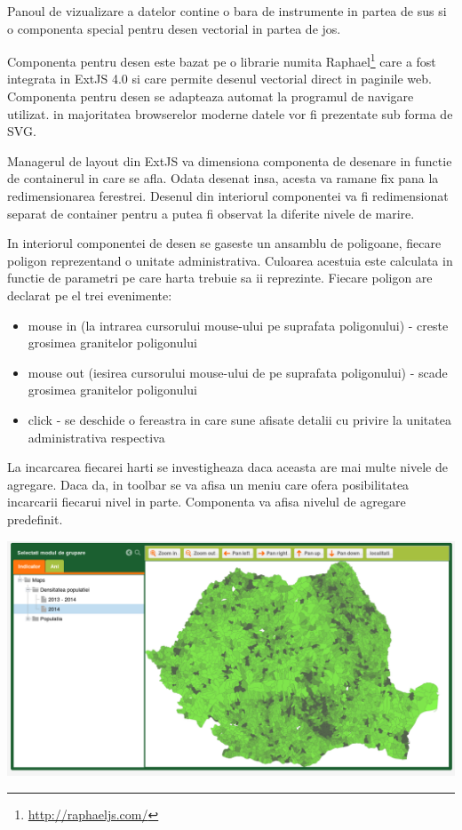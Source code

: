 \documentclass[a4paper, 10pt]{article}
\begin{document}
{Panoul de vizualizare a datelor contine o bara de instrumente in partea de sus si o componenta special pentru desen vectorial in partea de jos. 

Componenta pentru desen este bazat pe o librarie numita Raphael\footnote{\url{http://raphaeljs.com/}} care a fost integrata in ExtJS 4.0 si care permite desenul vectorial direct in paginile web. 
Componenta pentru desen se adapteaza automat la programul de navigare utilizat. in majoritatea browserelor moderne datele vor fi prezentate sub forma de SVG. 

Managerul de layout din ExtJS va dimensiona componenta de desenare in functie de containerul in care se afla. 
Odata desenat insa, acesta va ramane fix pana la redimensionarea ferestrei. 
Desenul din interiorul componentei va fi redimensionat separat de container pentru a putea fi observat la diferite nivele de marire. 

In interiorul componentei de desen se gaseste un ansamblu de poligoane, fiecare poligon reprezentand o unitate administrativa. 
Culoarea acestuia este calculata in functie de parametri pe care harta trebuie sa ii reprezinte. 
Fiecare poligon are declarat pe el trei evenimente:

\begin{itemize}
\item
mouse in (la intrarea cursorului mouse-ului pe suprafata poligonului) - creste grosimea granitelor poligonului
\item
mouse out (iesirea cursorului mouse-ului de pe suprafata poligonului) - scade grosimea granitelor poligonului
\item
click - se deschide o fereastra in care sune afisate detalii cu privire la unitatea administrativa respectiva
\end{itemize}

La incarcarea fiecarei harti se investigheaza daca aceasta are mai multe nivele de agregare. 
Daca da, in toolbar se va afisa un meniu care ofera posibilitatea incarcarii fiecarui nivel in parte. 
Componenta va afisa nivelul de agregare predefinit. 

\includegraphics[width=\textwidth]{img/geo-map}

}
\end{document}
